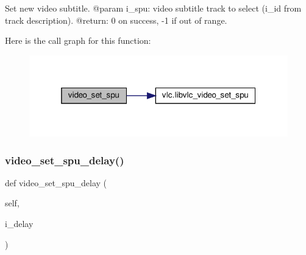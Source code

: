 \begin{DoxyVerb}Set new video subtitle.
@param i_spu: video subtitle track to select (i_id from track description).
@return: 0 on success, -1 if out of range.
\end{DoxyVerb}
 Here is the call graph for this function\+:
\nopagebreak
\begin{figure}[H]
\begin{center}
\leavevmode
\includegraphics[width=319pt]{classvlc_1_1_media_player_a41db63f2adaa98b00917f7090c1413e6_cgraph}
\end{center}
\end{figure}
\mbox{\label{classvlc_1_1_media_player_ae4fb19229a13d2a7b6a16b37d083244b}} 
\subsubsection{\texorpdfstring{video\+\_\+set\+\_\+spu\+\_\+delay()}{video\_set\_spu\_delay()}}
{\footnotesize\ttfamily def video\+\_\+set\+\_\+spu\+\_\+delay (\begin{DoxyParamCaption}\item[{}]{self,  }\item[{}]{i\+\_\+delay }\end{DoxyParamCaption})}

